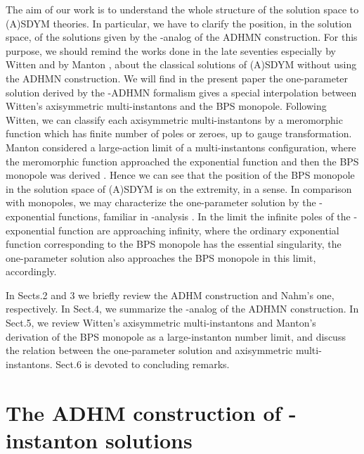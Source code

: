 \documentclass[a4paper,10pt]{article}
\begin{document}
The aim of our work is to understand the whole structure of the solution space to (A)SDYM theories.
In particular, we have to clarify the position, in the solution space, of the solutions given by the \coordHE{}-analog of the ADHMN construction.
For this purpose, we should remind the works done in the late seventies especially by Witten \cite{W} and by Manton \cite{Mant},  about the classical solutions of (A)SDYM without using the ADHMN construction.
We will find in the present paper the one-parameter solution derived by the \coordHE{}-ADHMN formalism gives a special interpolation between Witten's axisymmetric multi-instantons and the BPS monopole.
Following Witten, we can classify each axisymmetric multi-instantons by a meromorphic function which has finite number \coordHE{} of poles or zeroes, up to gauge transformation.
Manton \cite{Mant} considered a large-action limit \coordHE{} of a multi-instantons configuration, where the meromorphic function  approached the exponential function and then the BPS monopole was derived \cite{Mant}. 
Hence we can see that the position of the BPS monopole in the solution space of (A)SDYM is on the extremity, in a sense.
In comparison with monopoles, we may characterize the one-parameter solution by the \coordHE{}-exponential functions, familiar in \coordHE{}-analysis \cite{GR}.
In the limit \coordHE{} the infinite poles of the \coordHE{}-exponential function are approaching infinity, where the ordinary exponential function corresponding to the BPS monopole has the essential singularity, the one-parameter solution also approaches the BPS monopole in this limit, accordingly. 

In Sects.2 and 3 we briefly review the ADHM construction and Nahm's one, respectively. 
In Sect.4, we summarize the \coordHE{}-analog of the ADHMN construction.
In Sect.5, we review Witten's axisymmetric multi-instantons and Manton's derivation of the BPS monopole as a large-instanton number limit, and discuss the relation between the one-parameter solution and axisymmetric multi-instantons.
Sect.6 is devoted to concluding remarks.
\section{The ADHM construction of \coordHE{}-instanton solutions}
\end{document}
